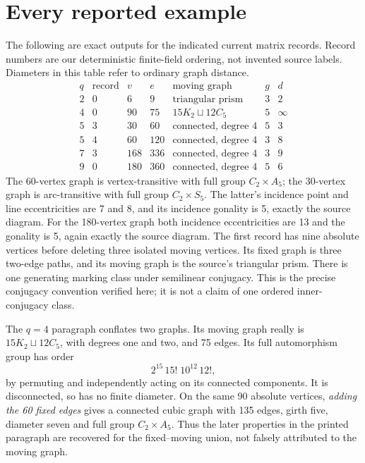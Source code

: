 \documentclass[11pt,a4paper]{article}
\begin{document}
\section{Every reported example}
The following are exact outputs for the indicated current matrix records.
Record numbers are our deterministic finite-field ordering, not invented
source labels. Diameters in this table refer to ordinary graph distance.
\[
\begin{array}{c|c|r|r|l|c|c}
q&\text{record}&v&e&\text{moving graph}&g&d\\\hline
2&0&6&9&\text{triangular prism}&3&2\\
4&0&90&75&15K_2\sqcup12C_5&5&\infty\\
5&3&30&60&\text{connected, degree }4&5&3\\
5&4&60&120&\text{connected, degree }4&3&8\\
7&3&168&336&\text{connected, degree }4&3&9\\
9&0&180&360&\text{connected, degree }4&5&6
\end{array}
\]
The 60-vertex graph is vertex-transitive with full group $C_2\times A_5$;
the 30-vertex graph is arc-transitive with full group $C_2\times S_5$.
The latter's incidence point and line eccentricities are 7 and 8, and
its incidence gonality is 5, exactly the source diagram. For the 180-vertex
graph both incidence eccentricities are 13 and the gonality is 5, again
exactly the source diagram. The first record has nine absolute vertices
before deleting three isolated moving vertices. Its fixed graph is three
two-edge paths, and its moving graph is the source's triangular prism.
There is one generating marking class under semilinear conjugacy. This
is the precise conjugacy convention verified here; it is not a claim of
one ordered inner-conjugacy class.

The $q=4$ paragraph conflates two graphs. Its moving graph really is
$15K_2\sqcup12C_5$, with degrees one and two, and 75 edges. Its full
automorphism group has order
\[
                        2^{15}\,15!\;10^{12}\,12!,
\]
by permuting and independently acting on its connected components.
It is disconnected, so has no finite diameter. On the same 90 absolute
vertices, \emph{adding the 60 fixed edges} gives a connected cubic graph
with 135 edges, girth five, diameter seven and full group $C_2\times A_5$.
Thus the later properties in the printed paragraph are recovered for the
fixed--moving union, not falsely attributed to the moving graph.
\end{document}
